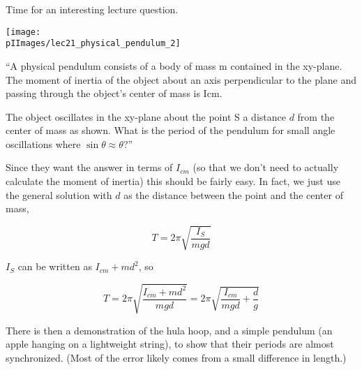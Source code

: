 Time for an interesting lecture question.

\begin{center}
\texttt{[image: \\pIImages/lec21\_physical\_pendulum\_2]}
\end{center}

``A physical pendulum consists of a body of mass m contained in the xy-plane. The moment of inertia of the object about an axis perpendicular to the plane and passing through the object's center of mass is Icm.

The object oscillates in the xy-plane about the point S a distance $d$ from the center of mass as shown. What is the period of the pendulum for small angle oscillations where $\sin\theta \approx \theta$?''

Since they want the answer in terms of $I_{cm}$ (so that we don't need to actually calculate the moment of inertia) this should be fairly easy. In fact, we just use the general solution with $d$ as the distance between the point and the center of mass,

\begin{equation}
T = 2 \pi \sqrt{\frac{I_{S}}{m g d}}
\end{equation}

$I_S$ can be written as $I_{cm} + m d^2$, so

\begin{equation}
T = 2 \pi \sqrt{\frac{I_{cm} + m d^2}{m g d}} = 2 \pi \sqrt{\frac{I_{cm}}{m g d} + \frac{d}{g}}
\end{equation}

There is then a demonstration of the hula hoop, and a simple pendulum (an apple hanging on a lightweight string), to show that their periods are almost synchronized. (Most of the error likely comes from a small difference in length.)
